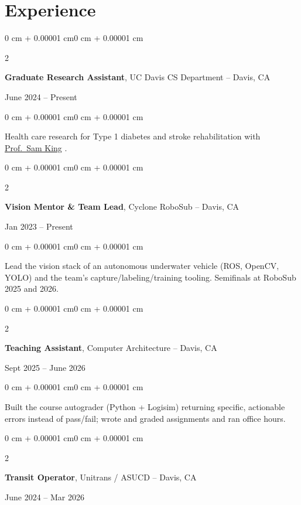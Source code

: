 \documentclass[10pt, letterpaper]{article}
\newenvironment{onecolentry}{
    \begin{adjustwidth}{0 cm + 0.00001 cm}{0 cm + 0.00001 cm}
}{
    \end{adjustwidth}
}
\newenvironment{twocolentry}[2][]{
    \onecolentry
    \def\secondColumn{#2}
    \setcolumnwidth{\fill, 6 cm}
    \begin{paracol}{2}
}{
    \switchcolumn \raggedleft \secondColumn
    \end{paracol}
    \endonecolentry
}
\newcommand{\entrygap}{\vspace{0.11 cm}}
\let\hrefWithoutArrow\href
\newcommand{\profSamKing}{%
    \hrefWithoutArrow{https://bob.cs.ucdavis.edu/}{Prof.\ Sam King}%
}
\begin{document}
    \section{Experience}

        \begin{twocolentry}{
            June 2024 -- Present
        }
            \textbf{Graduate Research Assistant}, UC Davis CS Department -- Davis, CA
        \end{twocolentry}

        \vspace{0.06 cm}
        \begin{onecolentry}
            Health care research for Type 1 diabetes and stroke rehabilitation with
            \profSamKing.
        \end{onecolentry}


        \entrygap

        \begin{twocolentry}{
            Jan 2023 -- Present
        }
            \textbf{Vision Mentor \& Team Lead}, Cyclone RoboSub -- Davis, CA
        \end{twocolentry}

        \vspace{0.06 cm}
        \begin{onecolentry}
            Lead the vision stack of an autonomous underwater vehicle (ROS, OpenCV, YOLO) and the
            team's capture/labeling/training tooling. Semifinals at RoboSub 2025 and 2026.
        \end{onecolentry}


        \entrygap

        \begin{twocolentry}{
            Sept 2025 -- June 2026
        }
            \textbf{Teaching Assistant}, Computer Architecture -- Davis, CA
        \end{twocolentry}

        \vspace{0.06 cm}
        \begin{onecolentry}
            Built the course autograder (Python + Logisim) returning specific, actionable errors
            instead of pass/fail; wrote and graded assignments and ran office hours.
        \end{onecolentry}


        \entrygap

        \begin{twocolentry}{
            June 2024 -- Mar 2026
        }
            \textbf{Transit Operator}, Unitrans / ASUCD -- Davis, CA
        \end{twocolentry}
\end{document}

